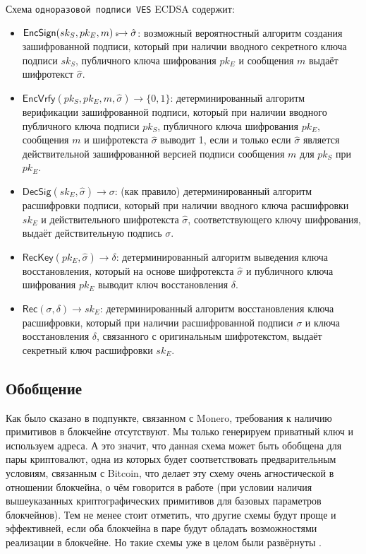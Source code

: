 \documentclass{llncs}
\newcommand{\EncSign}{\textsf{EncSign}}
\newcommand{\EncVer}{\textsf{EncVrfy}}
\newcommand{\DecSig}{\textsf{DecSig}}
\newcommand{\Rec}{\textsf{Rec}}
\newcommand{\RecKey}{\textsf{RecKey}}
\newcommand{\hatsigma}{\hat{\sigma}}
\newcommand{\skSign}{sk_S}
\newcommand{\pkSign}{pk_S}
\newcommand{\skEnc}{sk_E}
\newcommand{\pkEnc}{pk_E}
\newcommand{\rec}{\delta}
\newcommand{\bin}{\{0,1\}}
\begin{document}
\begin{definition}
    Схема \texttt{одноразовой подписи VES} ECDSA содержит:
\begin{itemize}
    \item $\EncSign(\skSign, \pkEnc, m) \hskip2.3pt{\mbox{\tiny${\$}$\normalsize}}\!\!\rightarrow \hatsigma$: возможный вероятностный алгоритм создания зашифрованной подписи, который при наличии вводного секретного ключа подписи $\skSign$, публичного ключа шифрования $\pkEnc$ и сообщения $m$ выдаёт шифротекст $\hatsigma$.
    \item $\EncVer(\pkSign, \pkEnc, m, \hatsigma) \rightarrow \bin$: детерминированный алгоритм верификации зашифрованной подписи, который при наличии вводного публичного ключа подписи $\pkSign$, публичного ключа шифрования $\pkEnc$, сообщения $m$ и шифротекста $\hatsigma$ выводит 1, если и только если $\hatsigma$ является действительной зашифрованной версией подписи сообщения $m$ для $\pkSign$ при $\pkEnc$.
    \item $\DecSig(\skEnc, \hatsigma) \rightarrow \sigma$: (как правило) детерминированный алгоритм расшифровки подписи, который при наличии вводного ключа расшифровки $\skEnc$ и действительного шифротекста $\hatsigma$, соответствующего ключу шифрования, выдаёт действительную подпись $\sigma$.
    \item $\RecKey(\pkEnc, \hatsigma) \rightarrow \delta$: детерминированный алгоритм выведения ключа восстановления, который на основе шифротекста $\hatsigma$ и публичного ключа шифрования $\pkEnc$ выводит ключ восстановления $\delta$.
    \item $\Rec(\sigma,\rec) \rightarrow \skEnc$: детерминированный алгоритм восстановления ключа расшифровки, который при наличии расшифрованной подписи $\sigma$ и ключа восстановления $\rec$, связанного с оригинальным шифротекстом, выдаёт секретный ключ расшифровки $\skEnc$.
\end{itemize}
\end{definition}

\subsection{Обобщение}
Как было сказано в подпункте, связанном с Monero, требования к наличию примитивов в блокчейне отсутствуют. Мы только генерируем приватный ключ и используем адреса. А это значит, что данная схема может быть обобщена для пары криптовалют, одна из которых будет соответствовать предварительным условиям, связанным с Bitcoin, что делает эту схему очень агностической в отношении блокчейна, о чём говорится в работе \cite{succinct-atomic-swap} (при условии наличия вышеуказанных криптографических примитивов для базовых параметров блокчейнов). Тем не менее стоит отметить, что другие схемы будут проще и эффективней, если оба блокчейна в паре будут обладать возможностями реализации в блокчейне. Но такие схемы уже в целом были развёрнуты \cite{atomic-swap, scriptless-atomic-swap, btcGrinSwap}.
\end{document}
